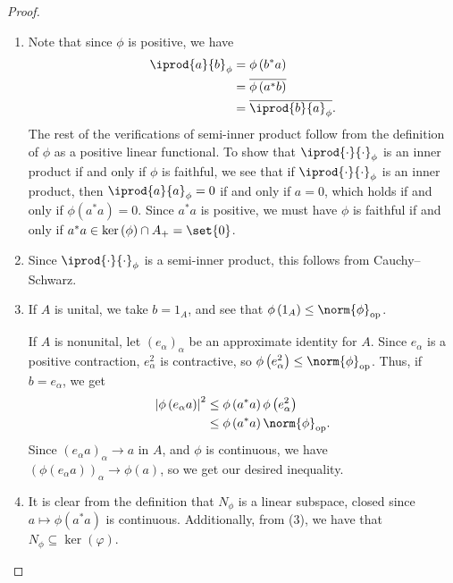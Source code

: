 \documentclass[10pt]{mypackage}
\DeclareMathOperator{\op}{op}
\begin{document}
\begin{proof}\hfill
  \begin{enumerate}[(1)]
    \item Note that since $\phi$ is positive, we have
      \begin{align*}
        \iprod{a}{b}_{\phi} &= \phi\left(b^{\ast}a\right)\\
                            &= \overline{\phi\left(a^{\ast}b\right)}\\
                            &= \overline{ \iprod{b}{a}_{\phi} }.
      \end{align*}
      The rest of the verifications of semi-inner product follow from the definition of $\phi$ as a positive linear functional. To show that $ \iprod{\cdot}{\cdot}_\phi$ is an inner product if and only if $\phi$ is faithful, we see that if $ \iprod{\cdot}{\cdot}_{\phi} $ is an inner product, then $ \iprod{a}{a}_{\phi} = 0 $ if and only if $a = 0$, which holds if and only if $\phi\left(a^{\ast}a\right) = 0$. Since $a^{\ast}a$ is positive, we must have $\phi$ is faithful if and only if $a^{\ast}a \in \ker\left(\phi\right)\cap A_{+} = \set{0}$.
    \item Since $ \iprod{\cdot}{\cdot}_{\phi} $ is a semi-inner product, this follows from Cauchy--Schwarz.
    \item If $A$ is unital, we take $b = 1_{A}$, and see that $\phi\left(1_A\right) \leq \norm{\phi}_{\op}$.\newline

      If $A$ is nonunital, let $\left(e_{\alpha}\right)_{\alpha}$ be an approximate identity for $A$. Since $e_{\alpha}$ is a positive contraction, $e_{\alpha}^2$ is contractive, so $\phi\left(e_{\alpha}^2\right)\leq \norm{\phi}_{\op}$. Thus, if $b = e_{\alpha}$, we get
      \begin{align*}
        \left\vert \phi\left(e_{\alpha}a\right) \right\vert^2 &\leq \phi\left(a^{\ast}a\right)\phi\left(e_{\alpha}^2\right)\\
                                                              &\leq \phi\left(a^{\ast}a\right)\norm{\phi}_{\op}.
      \end{align*}
      Since $\left(e_{\alpha}a\right)_{\alpha}\rightarrow a$ in $A$, and $\phi$ is continuous, we have $\left(\phi\left(e_{\alpha}a\right)\right)_{\alpha}\rightarrow \phi\left(a\right)$, so we get our desired inequality.
    \item It is clear from the definition that $N_{\phi}$ is a linear subspace, closed since $a\mapsto \phi\left(a^{\ast}a\right)$ is continuous. Additionally, from (3), we have that $N_{\phi}\subseteq \ker\left(\varphi\right)$.
  \end{enumerate}
\end{proof}
\end{document}
